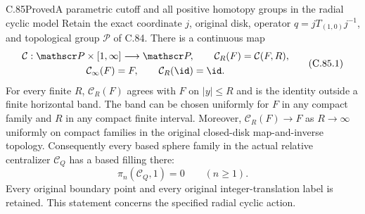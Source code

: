 \begin{claim}{C.85}{Proved}{A parametric cutoff and all positive homotopy groups in the radial cyclic model}
Retain the exact coordinate $j$, original disk,
operator $q=jT_{(1,0)}j^{-1}$, and topological
group $\mathscr P$ of C.84.
There is a continuous map
\[
 \begin{gathered}
 \mathcal C:\mathscr P\times[1,\infty]
                 \longrightarrow\mathscr P,\qquad
 \mathcal C_R(F)=\mathcal C(F,R),\\
 \mathcal C_\infty(F)=F,\qquad
 \mathcal C_R(\id)=\id.
 \end{gathered}                                                   \tag{C.85.1}
\]
For every finite $R$, $\mathcal C_R(F)$ agrees
with $F$ on $|y|\leq R$ and is the identity
outside a finite horizontal band. The band
can be chosen uniformly for $F$ in any
compact family and $R$ in any compact
finite interval. Moreover,
$\mathcal C_R(F)\to F$ as $R\to\infty$
uniformly on compact families in the
original closed-disk map-and-inverse topology.
Consequently every based sphere family in
the actual relative centralizer
$\mathscr C_Q$ has a based filling there:
\[
                 \pi_n(\mathscr C_Q,1)=0
                         \qquad(n\geq1).                         \tag{C.85.2}
\]
Every original boundary point and every
original integer-translation label is
retained. This statement concerns the
specified radial cyclic action.
\end{claim}

